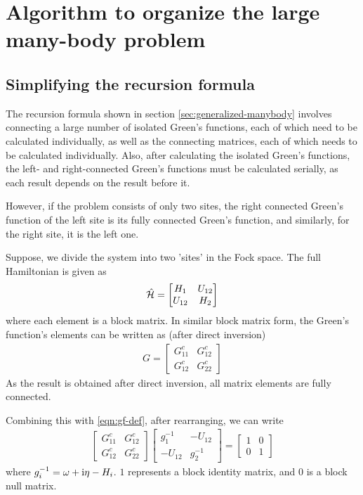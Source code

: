 \chapter{\label{algo}Algorithm to organize the large many-body problem}

\setcounter{equation}{0}
\setcounter{table}{0}
\setcounter{figure}{0}

\section{Simplifying the recursion formula}
	The recursion formula shown in section  \ref{sec:generalized-manybody} involves connecting a large number of isolated Green's functions, each of which need to be calculated individually, as well as the connecting matrices, each of which needs to be calculated individually. Also, after calculating the isolated Green's functions, the left- and right-connected Green's functions must be calculated serially, as each result depends on the result before it.
	
	However, if the problem consists of only two sites, the right connected Green's function of the left site is its fully connected Green's function, and similarly, for the right site, it is the left one.
	
	Suppose, we divide the system into two 'sites' in the Fock space. The full Hamiltonian is given as
	\begin{align}
		\hat{\mathcal{H}} =
		\begin{bmatrix}
			H_1 	& 	U_{12} \\
			U_{12} 	& 	H_2
		\end{bmatrix}
	\end{align}
	where each element is a block matrix. In similar block matrix form, the Green's function's elements can be written as (after direct inversion)
	\begin{align}
		G =
			\begin{bmatrix}
			{G}^{c}_{11} 	& 	{G}^{c}_{12} \\
			{G}^{c}_{12} 	& 	{G}^{c}_{22}
			\end{bmatrix}
	\end{align}
	As the result is obtained after direct inversion, all matrix elements are fully connected.
	
	Combining this with \eqref{eqn:gf-def}, after rearranging, we can write
	\begin{align}
		\begin{bmatrix}
			{G}^{c}_{11} 	& 	{G}^{c}_{12} \\
			{G}^{c}_{12} 	& 	{G}^{c}_{22}
		\end{bmatrix}
		\begin{bmatrix}
			g^{-1}_{1} 	& 	-U_{12} \\
			-U_{12} 	& 	g^{-1}_{2}
		\end{bmatrix} = 
		\begin{bmatrix}
			1 & 0\\
			0 & 1
		\end{bmatrix}
	\end{align}
	where $ g^{-1}_{i} = \omega +\mathrm{i} \eta - H_i $. $ 1 $ represents a block identity matrix, and $ 0 $ is a block null matrix.
	
